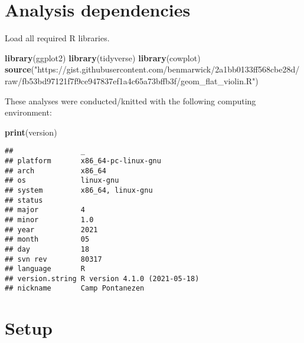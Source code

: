 \documentclass[]{book}
\newenvironment{Shaded}{\begin{snugshade}}{\end{snugshade}}
\newcommand{\KeywordTok}[1]{\textcolor[rgb]{0.13,0.29,0.53}{\textbf{#1}}}
\newcommand{\NormalTok}[1]{#1}
\newcommand{\StringTok}[1]{\textcolor[rgb]{0.31,0.60,0.02}{#1}}
\begin{document}
\hypertarget{analysis-dependencies}{%
\section{Analysis dependencies}\label{analysis-dependencies}}

Load all required R libraries.

\begin{Shaded}
\begin{Highlighting}[]
\KeywordTok{library}\NormalTok{(ggplot2)}
\KeywordTok{library}\NormalTok{(tidyverse)}
\KeywordTok{library}\NormalTok{(cowplot)}
\KeywordTok{source}\NormalTok{(}\StringTok{"https://gist.githubusercontent.com/benmarwick/2a1bb0133ff568cbe28d/raw/fb53bd97121f7f9ce947837ef1a4c65a73bffb3f/geom_flat_violin.R"}\NormalTok{)}
\end{Highlighting}
\end{Shaded}

These analyses were conducted/knitted with the following computing environment:

\begin{Shaded}
\begin{Highlighting}[]
\KeywordTok{print}\NormalTok{(version)}
\end{Highlighting}
\end{Shaded}

\begin{verbatim}
##                _                           
## platform       x86_64-pc-linux-gnu         
## arch           x86_64                      
## os             linux-gnu                   
## system         x86_64, linux-gnu           
## status                                     
## major          4                           
## minor          1.0                         
## year           2021                        
## month          05                          
## day            18                          
## svn rev        80317                       
## language       R                           
## version.string R version 4.1.0 (2021-05-18)
## nickname       Camp Pontanezen
\end{verbatim}

\hypertarget{setup}{%
\section{Setup}\label{setup}}
\end{document}
